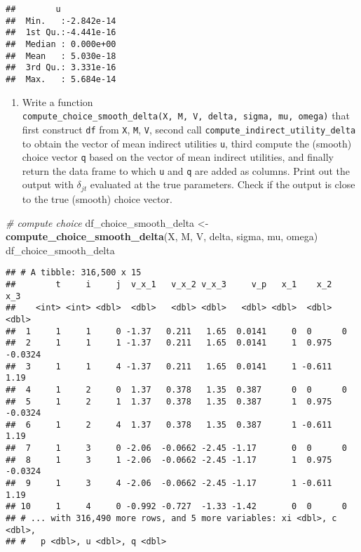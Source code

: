 \documentclass[
]{book}
\newenvironment{Shaded}{\begin{snugshade}}{\end{snugshade}}
\newcommand{\CommentTok}[1]{\textcolor[rgb]{0.56,0.35,0.01}{\textit{#1}}}
\newcommand{\KeywordTok}[1]{\textcolor[rgb]{0.13,0.29,0.53}{\textbf{#1}}}
\newcommand{\NormalTok}[1]{#1}
\newcommand{\StringTok}[1]{\textcolor[rgb]{0.31,0.60,0.02}{#1}}
\providecommand{\tightlist}{%
  \setlength{\itemsep}{0pt}\setlength{\parskip}{0pt}}
\begin{document}
\begin{verbatim}
##        u             
##  Min.   :-2.842e-14  
##  1st Qu.:-4.441e-16  
##  Median : 0.000e+00  
##  Mean   : 5.030e-18  
##  3rd Qu.: 3.331e-16  
##  Max.   : 5.684e-14
\end{verbatim}

\begin{enumerate}
\def\labelenumi{\arabic{enumi}.}
\setcounter{enumi}{5}
\tightlist
\item
  Write a function \texttt{compute\_choice\_smooth\_delta(X,\ M,\ V,\ delta,\ sigma,\ mu,\ omega)} that first construct \texttt{df} from \texttt{X}, \texttt{M}, \texttt{V}, second call \texttt{compute\_indirect\_utility\_delta} to obtain the vector of mean indirect utilities \texttt{u}, third compute the (smooth) choice vector \texttt{q} based on the vector of mean indirect utilities, and finally return the data frame to which \texttt{u} and \texttt{q} are added as columns. Print out the output with \(\delta_{jt}\) evaluated at the true parameters. Check if the output is close to the true (smooth) choice vector.
\end{enumerate}

\begin{Shaded}
\begin{Highlighting}[]
\CommentTok{# compute choice}
\NormalTok{df_choice_smooth_delta <-}\StringTok{ }
\StringTok{  }\KeywordTok{compute_choice_smooth_delta}\NormalTok{(X, M, V, delta, sigma, mu, omega)}
\NormalTok{df_choice_smooth_delta}
\end{Highlighting}
\end{Shaded}

\begin{verbatim}
## # A tibble: 316,500 x 15
##        t     i     j  v_x_1   v_x_2 v_x_3     v_p   x_1    x_2     x_3
##    <int> <int> <dbl>  <dbl>   <dbl> <dbl>   <dbl> <dbl>  <dbl>   <dbl>
##  1     1     1     0 -1.37   0.211   1.65  0.0141     0  0      0     
##  2     1     1     1 -1.37   0.211   1.65  0.0141     1  0.975 -0.0324
##  3     1     1     4 -1.37   0.211   1.65  0.0141     1 -0.611  1.19  
##  4     1     2     0  1.37   0.378   1.35  0.387      0  0      0     
##  5     1     2     1  1.37   0.378   1.35  0.387      1  0.975 -0.0324
##  6     1     2     4  1.37   0.378   1.35  0.387      1 -0.611  1.19  
##  7     1     3     0 -2.06  -0.0662 -2.45 -1.17       0  0      0     
##  8     1     3     1 -2.06  -0.0662 -2.45 -1.17       1  0.975 -0.0324
##  9     1     3     4 -2.06  -0.0662 -2.45 -1.17       1 -0.611  1.19  
## 10     1     4     0 -0.992 -0.727  -1.33 -1.42       0  0      0     
## # ... with 316,490 more rows, and 5 more variables: xi <dbl>, c <dbl>,
## #   p <dbl>, u <dbl>, q <dbl>
\end{verbatim}
\end{document}
